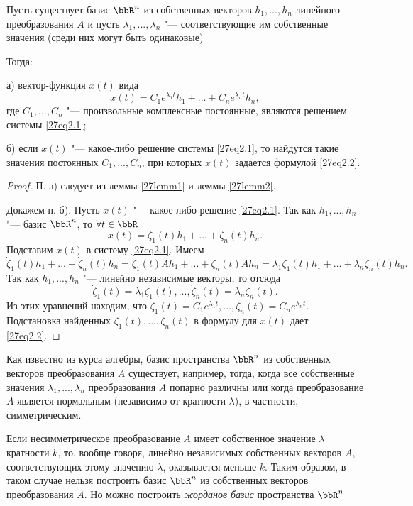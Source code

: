 \begin{thm}\label{27thm1}
Пусть существует базис $\bbR^n$ из собственных векторов $h_1,...,h_n$ линейного преобразования $A$ и пусть $\lambda_1,...,\lambda_n$ "--- соответствующие им собственные значения (среди них могут быть одинаковые)

Тогда:

а) вектор-функция $x(t)$ вида
\begin{equation}\label{27eq2.2}
x(t)=C_1e^{\lambda_1 t}h_1+...+C_ne^{\lambda_n t}h_n,
\end{equation}
где  $C_1,...,C_n$ "--- произвольные комплексные постоянные, являются решением системы \eqref{27eq2.1};

б) если $x(t)$ "--- какое-либо решение системы \eqref{27eq2.1}, то найдутся такие значения постоянных $C_1,...,C_n$, при которых $x(t)$ задается формулой \eqref{27eq2.2}.
\end{thm}
\begin{proof}
П. а)  следует из леммы \ref{27lemm1} и леммы \ref{27lemm2}. 

Докажем п. б). Пусть $x(t)$ "--- какое-либо решение \eqref{27eq2.1}. Так как $h_1,...,h_n$ "--- базис $\bbR^n$, то $\forall t\in \bbR$
$$
x(t)=\zeta_1(t)h_1+...+\zeta_n(t)h_n.
$$
Подставим $x(t)$ в систему \eqref{27eq2.1}. Имеем
$$
\dot{\zeta}_1(t)h_1+...+\dot\zeta_n(t)h_n=\zeta_1(t)Ah_1+...+\zeta_n(t)Ah_n=\lambda_1\zeta_1(t)h_1+...+\lambda_n\zeta_n(t)h_n.
$$
Так как $h_1,...,h_n$ "--- линейно независимые векторы, то отсюда
$$
\dot{\zeta}_1(t)=\lambda_1\zeta_1(t),...,\dot{\zeta}_n(t)=\lambda_n\zeta_n(t).
$$
Из этих уравнений находим, что $\zeta_1(t)=C_1e^{\lambda_1t},...,\zeta_n(t)=C_ne^{\lambda_n t}$. Подстановка найденных $\zeta_1(t),...,\zeta_n(t)$ в формулу для $x(t)$ дает \eqref{27eq2.2}.
\end{proof}

Как известно из курса алгебры, базис пространства $\bbR^n$ из собственных векторов преобразования $A$ существует, например, тогда, когда все собственные значения $\lambda_1,...,\lambda_n$ преобразования $A$ попарно различны или когда преобразование $A$ является нормальным (независимо от кратности $\lambda$), в частности, симметрическим.

Если несимметрическое преобразование $A$ имеет собственное значение  $\lambda$ кратности $k$, то, вообще говоря, линейно независимых собственных векторов $A$, соответствующих этому значению $\lambda$, оказывается меньше $k$. Таким образом, в таком случае нельзя построить базис $\bbR^n$ из собственных векторов преобразования $A$. Но можно построить \textit{жорданов базис} пространства $\bbR^n$


